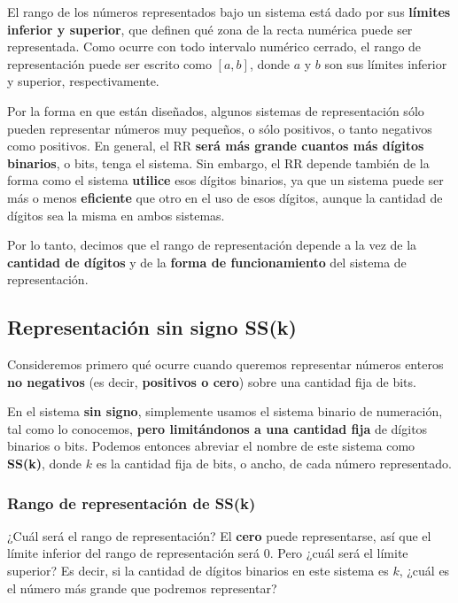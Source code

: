 \documentclass[spanish,A4,]{article}
\begin{document}
El rango de los números representados bajo un sistema está dado por sus
\textbf{límites inferior y superior}, que definen qué zona de la recta
numérica puede ser representada. Como ocurre con todo intervalo numérico
cerrado, el rango de representación puede ser escrito como $[a, b]$,
donde $a$ y $b$ son sus límites inferior y superior, respectivamente.

Por la forma en que están diseñados, algunos sistemas de representación
sólo pueden representar números muy pequeños, o sólo positivos, o tanto
negativos como positivos. En general, el RR \textbf{será más grande
cuantos más dígitos binarios}, o bits, tenga el sistema. Sin embargo, el
RR depende también de la forma como el sistema \textbf{utilice} esos
dígitos binarios, ya que un sistema puede ser más o menos
\textbf{eficiente} que otro en el uso de esos dígitos, aunque la
cantidad de dígitos sea la misma en ambos sistemas.

Por lo tanto, decimos que el rango de representación depende a la vez de
la \textbf{cantidad de dígitos} y de la \textbf{forma de funcionamiento}
del sistema de representación.

\subsection{Representación sin signo
SS(k)}\label{representaciuxf3n-sin-signo-ssk}

Consideremos primero qué ocurre cuando queremos representar números
enteros \textbf{no negativos} (es decir, \textbf{positivos o cero})
sobre una cantidad fija de bits.

En el sistema \textbf{sin signo}, simplemente usamos el sistema binario
de numeración, tal como lo conocemos, \textbf{pero limitándonos a una
cantidad fija} de dígitos binarios o bits. Podemos entonces abreviar el
nombre de este sistema como \textbf{SS(k)}, donde $k$ es la cantidad
fija de bits, o ancho, de cada número representado.

\subsubsection{Rango de representación de
SS(k)}\label{rango-de-representaciuxf3n-de-ssk}

¿Cuál será el rango de representación? El \textbf{cero} puede
representarse, así que el límite inferior del rango de representación
será 0. Pero ¿cuál será el límite superior? Es decir, si la cantidad de
dígitos binarios en este sistema es $k$, ¿cuál es el número más grande
que podremos representar?
\end{document}
